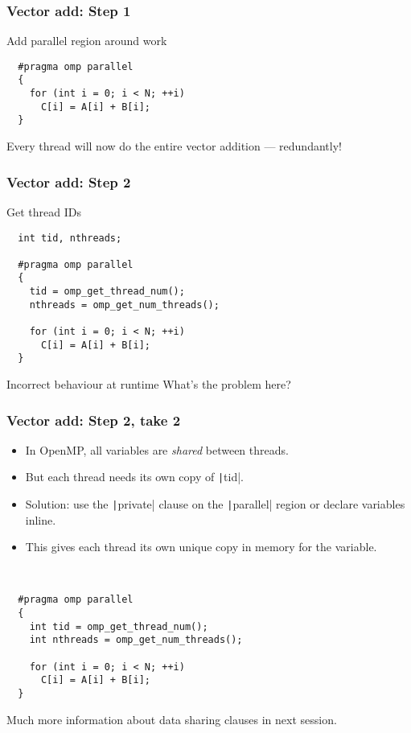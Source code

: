 \documentclass{beamer}
\begin{document}
\begin{frame}[fragile]
\frametitle{Vector add: Step 1}
Add parallel region around work
\begin{verbatim}
  #pragma omp parallel
  {
    for (int i = 0; i < N; ++i)
      C[i] = A[i] + B[i];
  }
\end{verbatim}
Every thread will now do the entire vector addition --- redundantly!
\end{frame}

\begin{frame}[fragile]
\frametitle{Vector add: Step 2}
Get thread IDs
\begin{verbatim}
  int tid, nthreads;

  #pragma omp parallel
  {
    tid = omp_get_thread_num();
    nthreads = omp_get_num_threads();

    for (int i = 0; i < N; ++i)
      C[i] = A[i] + B[i];
  }
\end{verbatim}

\pause
\begin{alertblock}{Incorrect behaviour at runtime}
What's the problem here?
\end{alertblock}
\end{frame}

\begin{frame}[fragile]
\frametitle{Vector add: Step 2, take 2}

\begin{itemize}
  \item In OpenMP, all variables are \emph{shared} between threads.
  \item But each thread needs its own copy of \texttt|tid|.
  \item Solution: use the \texttt|private| clause on the \texttt|parallel| region or declare variables inline.
  \item This gives each thread its own unique copy in memory for the variable.
\end{itemize}

\begin{verbatim}


  #pragma omp parallel
  {
    int tid = omp_get_thread_num();
    int nthreads = omp_get_num_threads();

    for (int i = 0; i < N; ++i)
      C[i] = A[i] + B[i];
  }
\end{verbatim}
Much more information about data sharing clauses in next session.
\end{frame}
\end{document}
